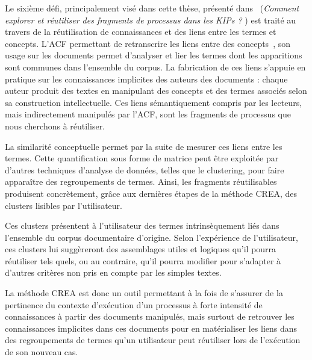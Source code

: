 \bigskip

Le sixième défi, principalement visé dans cette thèse, présenté dans~\cite{boissier2019challenges} (\og \textit{Comment explorer et réutiliser des fragments de processus dans les KIPs ?} \fg) est traité au travers de la réutilisation de connaissances et des liens entre les termes et concepts.
L'ACF permettant de retranscrire les liens entre des concepts~\cite{wormuth2004introduction}, son usage sur les documents permet d'analyser et lier les termes dont les apparitions sont communes dans l'ensemble du corpus.
La fabrication de ces liens s'appuie en pratique sur les connaissances implicites des auteurs des documents : chaque auteur produit des textes en manipulant des concepts et des termes associés selon sa construction intellectuelle.
Ces liens sémantiquement compris par les lecteurs, mais indirectement manipulés par l'ACF, sont les fragments de processus que nous cherchons à réutiliser.

La similarité conceptuelle permet par la suite de mesurer ces liens entre les termes.
Cette quantification sous forme de matrice peut être exploitée par d'autres techniques d'analyse de données, telles que le clustering, pour faire apparaître des regroupements de termes.
Ainsi, les fragments réutilisables produisent concrètement, grâce aux dernières étapes de la méthode CREA, des clusters lisibles par l'utilisateur.

Ces clusters présentent à l'utilisateur des termes intrinsèquement liés dans l'ensemble du corpus documentaire d'origine.
Selon l'expérience de l'utilisateur, ces clusters lui suggèreront des assemblages utiles et logiques qu'il pourra réutiliser tels quels, ou au contraire, qu'il pourra modifier pour s'adapter à d'autres critères non pris en compte par les simples textes.


\bigskip

La méthode CREA est donc un outil permettant à la fois de s'assurer de la pertinence du contexte d'exécution d'un processus à forte intensité de connaissances à partir des documents manipulés, mais surtout de retrouver les connaissances implicites dans ces documents pour en matérialiser les liens dans des regroupements de termes qu'un utilisateur peut réutiliser lors de l'exécution de son nouveau cas.
